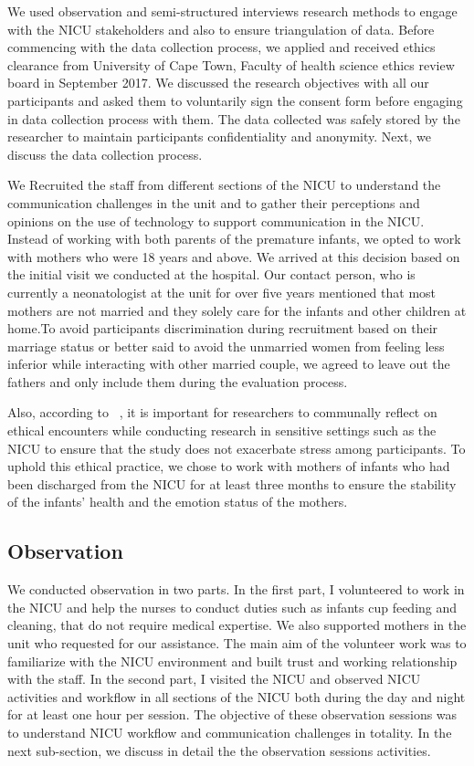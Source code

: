 We used observation and semi-structured interviews research methods to engage with the NICU stakeholders and also to ensure triangulation of data. Before commencing with the data collection process, we applied and received ethics clearance from University of Cape Town, Faculty of health science ethics review board in September 2017. We discussed the research objectives with all our participants and asked them to voluntarily sign the consent form before engaging in data collection process with them. The data collected was safely stored by the researcher to maintain participants confidentiality and anonymity. Next, we discuss the data collection process.

We Recruited the staff from different sections of the NICU to understand the communication challenges in the unit and to gather their perceptions and opinions on the use of technology to support communication in the NICU. Instead of working with both parents of the premature infants, we opted to work with mothers who were 18 years and above. We arrived at this decision based on the initial visit we conducted at the hospital. Our contact person, who is currently a neonatologist at the unit for over five years mentioned that most mothers are not married and they solely care for the infants and other children at home.To avoid participants discrimination during recruitment based on their marriage status or better said to avoid the unmarried women from feeling less inferior while interacting with other married couple, we agreed to leave out the fathers and only include them during the evaluation process.

Also, according to ~\textcite{Waycott2015}, it is important for researchers to communally reflect on ethical encounters while conducting research in sensitive settings such as the NICU to ensure that the study does not exacerbate stress among participants. To uphold this ethical practice, we chose to work with mothers of infants who had been discharged from the NICU for at least three months to ensure the stability of the infants’ health and the emotion status of the mothers.

\subsection{Observation}
We conducted observation in two parts. In the first part, I volunteered to work in the NICU and help the nurses to conduct duties such as infants cup feeding and cleaning, that do not require medical expertise. We also supported mothers in the unit who requested for our assistance. The main aim of the volunteer work was to familiarize with the NICU environment and built trust and working relationship with the staff. In the second part, I visited the NICU and observed NICU activities and workflow in all sections of the NICU both during the day and night for at least one hour per session. The objective of these observation sessions was to understand NICU workflow and communication challenges in totality. In the next sub-section, we discuss in detail the  the observation sessions activities.

